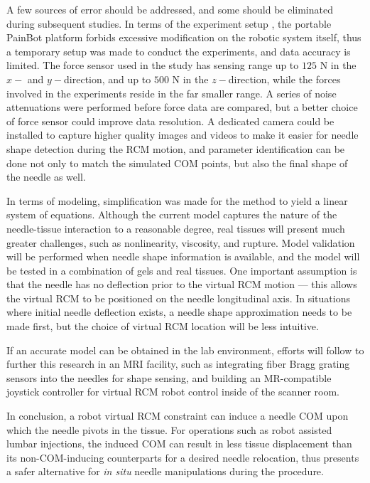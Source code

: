 A few sources of error should be addressed, and some should be eliminated during subsequent studies. In terms of the experiment setup , the portable PainBot platform forbids excessive modification on the robotic system itself, thus a temporary setup was made to conduct the experiments, and data accuracy is limited. The force sensor used in the study has sensing range up to $125$ N in the $x-$ and $y-$direction, and up to $500$ N in the $z-$direction, while the forces involved in the experiments reside in the far smaller range. A series of noise attenuations were performed before force data are compared, but a better choice of force sensor could improve data resolution. A dedicated camera could be installed to capture higher quality images and videos to make it easier for needle shape detection during the RCM motion, and parameter identification can be done not only to match the simulated COM points, but also the final shape of the needle as well.

In terms of modeling, simplification was made for the method to yield a linear system of equations. Although the current model captures the nature of the needle-tissue interaction to a reasonable degree, real tissues will present much greater challenges, such as nonlinearity, viscosity, and rupture. Model validation will be performed when needle shape information is available, and the model will be tested in a combination of gels and real tissues. One important assumption is that the needle has no deflection prior to the virtual RCM motion --- this allows the virtual RCM to be positioned on the needle longitudinal axis. In situations where initial needle deflection exists, a needle shape approximation needs to be made first, but the choice of virtual RCM location will be less intuitive.

If an accurate model can be obtained in the lab environment, efforts will follow to further this research in an MRI facility, such as integrating fiber Bragg grating sensors into the needles for shape sensing, and building an MR-compatible joystick controller for virtual RCM robot control inside of the scanner room.

In conclusion, a robot virtual RCM constraint can induce a needle COM upon which the needle pivots in the tissue. For operations such as robot assisted lumbar injections, the induced COM can result in less tissue displacement than its non-COM-inducing counterparts for a desired needle relocation, thus presents a safer alternative for \textit{in situ} needle manipulations during the procedure.

